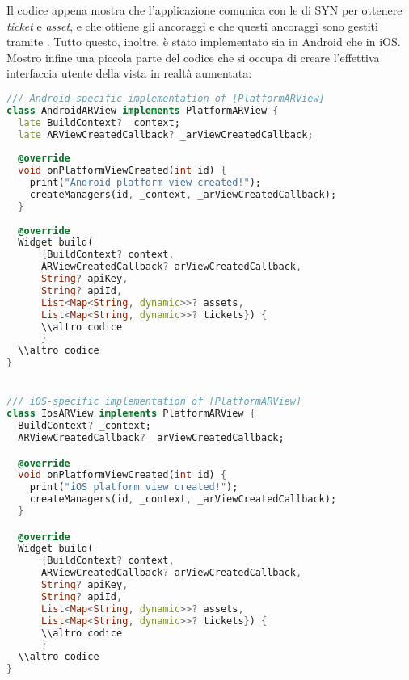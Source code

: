 Il codice appena mostra che l'applicazione comunica con le \api{} di SYN per ottenere \textit{ticket} e \textit{asset}, e che ottiene gli ancoraggi e che questi ancoraggi sono gestiti tramite \asa{}. Tutto questo, inoltre, è stato implementato sia in Android che in iOS.\\
Mostro infine una piccola parte del codice che si occupa di creare l'effettiva interfaccia utente della vista in realtà aumentata:

\begin{lstlisting}[language=dart, label={lst:ar_view}, firstnumber=1,caption={Frammento di codice per vista in realtà aumenta in Dart}]
/// Android-specific implementation of [PlatformARView]
class AndroidARView implements PlatformARView {
  late BuildContext? _context;
  late ARViewCreatedCallback? _arViewCreatedCallback;
  
  @override
  void onPlatformViewCreated(int id) {
    print("Android platform view created!");
    createManagers(id, _context, _arViewCreatedCallback);
  }
  
  @override
  Widget build(
      {BuildContext? context,
      ARViewCreatedCallback? arViewCreatedCallback,
      String? apiKey,
      String? apiId,
      List<Map<String, dynamic>>? assets,
      List<Map<String, dynamic>>? tickets}) {
      \\altro codice
      }
  \\altro codice
}


/// iOS-specific implementation of [PlatformARView]
class IosARView implements PlatformARView {
  BuildContext? _context;
  ARViewCreatedCallback? _arViewCreatedCallback;

  @override
  void onPlatformViewCreated(int id) {
    print("iOS platform view created!");
    createManagers(id, _context, _arViewCreatedCallback);
  }

  @override
  Widget build(
      {BuildContext? context,
      ARViewCreatedCallback? arViewCreatedCallback,
      String? apiKey,
      String? apiId,
      List<Map<String, dynamic>>? assets,
      List<Map<String, dynamic>>? tickets}) {
      \\altro codice
      }
  \\altro codice
}
\end{lstlisting}

